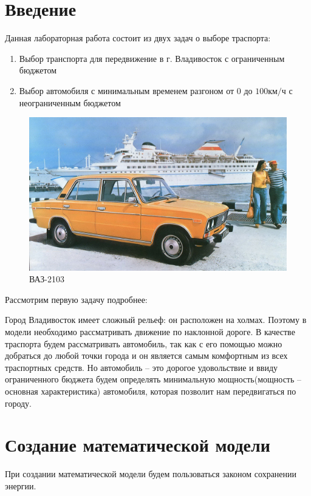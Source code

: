 \documentclass[a4paper, 14pt]{extarticle}
\begin{document}
	\pagebreak	

	\section{Введение}
		Данная лабораторная работа состоит из двух задач о выборе траспорта:
		\begin{enumerate}
			\item Выбор транспорта для передвижение в г. Владивосток с ограниченным бюджетом
			\item Выбор автомобиля с минимальным временем разгоном от 0 до \(100 \text{км}/\text{ч} \) с неограниченным
			бюджетом
		\end{enumerate}
	
		\begin{figure}[H]
			\centering
			\includegraphics[width = \linewidth]{fig1.jpg}
			\caption[.] {ВАЗ-2103}
		\end{figure}
		Рассмотрим первую задачу подробнее:
		
			Город Владивосток имеет сложный рельеф: он расположен на холмах. Поэтому в модели необходимо рассматривать движение по наклонной дороге. В качестве траспорта будем рассматривать автомобиль, так как с его помощью можно  добраться до любой точки города и он является самым комфортным из всех траспортных средств. Но автомобиль -- это дорогое удовольствие и ввиду ограниченного бюджета будем определять  минимальную мощность(мощность -- основная характеристика) автомобиля, которая позволит нам передвигаться по городу.

	\section{Создание математической модели}
		При создании математической модели будем пользоваться законом сохранении энергии.
\end{document}
